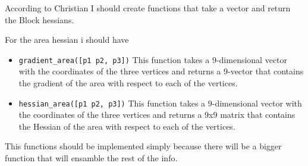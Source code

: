 \documentclass[11pt]{article}
\theoremstyle{plain}
\theoremstyle{definition}
\begin{document}
According to Christian I should create functions that take a vector and return the Block hessians.

For the area hessian i should have 

\begin{itemize}
    \item \texttt{gradient_area([p1 p2, p3])} This function takes a 9-dimensional vector with the coordinates of the three vertices and returns a  9-vector that contains the gradient of the area with respect to each of the vertices.
    \item \texttt{hessian_area([p1 p2, p3])} This function takes a 9-dimensional vector with the coordinates of the three vertices and returns a 9x9 matrix that contains the Hessian of the area with respect to each of the vertices.
\end{itemize}

This functions should be implemented simply because there will be a bigger function that will ensamble the rest of the info.
\end{document}

